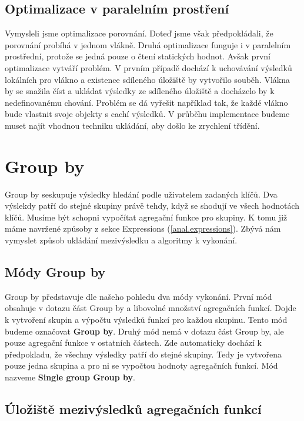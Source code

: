 \subsection{Optimalizace v paralelním prostření}

Vymysleli jsme optimalizace porovnání.
Doteď jsme však předpokládali, že porovnání probíhá v jednom vlákně.
Druhá optimalizace funguje i v paralelním prostřední, protože se jedná pouze o čtení statických hodnot.
Avšak první optimalizace vytváří problém.
V prvním případě dochází k uchovávání výsledků lokálních pro vlákno a existence sdíleného úložiště by vytvořilo souběh.
Vlákna by se snažila číst a ukládat výsledky ze sdíleného úložiště a docházelo by k nedefinovanému chování.
Problém se dá vyřešit například tak, že každé vlákno bude vlastnit svoje objekty s cachí výsledků.
V průběhu implementace budeme muset najít vhodnou techniku ukládání, aby došlo ke zrychlení třídění.

\section{Group by}

Group by seskupuje výsledky hledání podle uživatelem zadaných klíčů.
Dva výslekdy patří do stejné skupiny právě tehdy, když se shodují ve všech hodnotách klíčů.
Musíme být schopni vypočítat agregační funkce pro skupiny.
K tomu již máme navržené způsoby z sekce Expressions (\ref{anal.expressions}).
Zbývá nám vymyslet způsob ukládání mezivýsledku a algoritmy k vykonání.

\subsection{Módy Group by}

Group by představuje dle našeho pohledu dva módy vykonání.
První mód obsahuje v dotazu část Group by a libovolné množství agregačních funkcí.
Dojde k vytvoření skupin a výpočtu výsledků funkcí pro každou skupinu.
Tento mód budeme označovat \textbf{Group by}.
Druhý mód nemá v dotazu část Group by, ale pouze agregační funkce v ostatních částech.
Zde automaticky dochází k předpokladu, že všechny výsledky patří do stejné skupiny.
Tedy je vytvořena pouze jedna skupina a pro ni se vypočtou hodnoty agregačních funkcí.
Mód nazveme \textbf{Single group Group by}.


\subsection{Úložiště mezivýsledků agregačních funkcí} \label{anal.groupby.uloziste}

